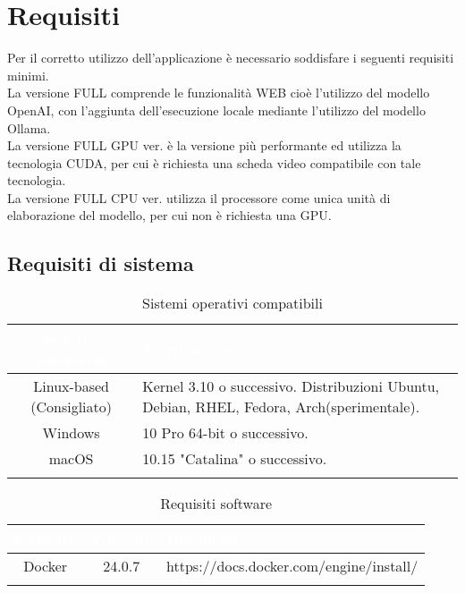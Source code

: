 \chapter{Requisiti} \label{cap:Req}
Per il corretto utilizzo dell'applicazione è necessario soddisfare i seguenti requisiti minimi.\\
La versione FULL comprende le funzionalità WEB cioè l'utilizzo del modello OpenAI, con l'aggiunta dell'esecuzione locale mediante l'utilizzo del modello Ollama.\\
La versione FULL GPU ver. è la versione più performante ed utilizza la tecnologia CUDA, per cui è richiesta una scheda video compatibile con tale tecnologia.\\
La versione FULL CPU ver. utilizza il processore come unica unità di elaborazione del modello, per cui non è richiesta una GPU.
\section{Requisiti di sistema}
\begingroup
\setlength{\tabcolsep}{10pt}
\renewcommand{\arraystretch}{1.5}
\begin{xltabular}{\textwidth}{| c | X |}
    \hline
     \textbf{\textcolor{white}{Sistema Operativo}} & \textbf{\textcolor{white}{Distribuzione}}\\
    \hline
    \endhead
    Linux-based (Consigliato) & Kernel 3.10 o successivo. Distribuzioni Ubuntu, Debian, RHEL, Fedora, Arch(sperimentale).\\
    \hline
    Windows & 10 Pro 64-bit o successivo.\\
    \hline
    macOS & 10.15 "Catalina" o successivo.\\
    \hline
     \caption{Sistemi operativi compatibili}
    \label{tab:reqso}
\end{xltabular}
\endgroup

\begingroup
\setlength{\tabcolsep}{10pt}
\renewcommand{\arraystretch}{1.5}
\begin{xltabular}{\textwidth}{| c | c | X |}
    \hline
     \textbf{\textcolor{white}{Software}} & \textbf{\textcolor{white}{Versione}} & \textbf{\textcolor{white}{Download}}\\
    \hline
    \endhead
    Docker & 24.0.7 & https://docs.docker.com/engine/install/ \\
    \hline
     \caption{Requisiti software}
    \label{tab:reqsoft}
\end{xltabular}
\endgroup

